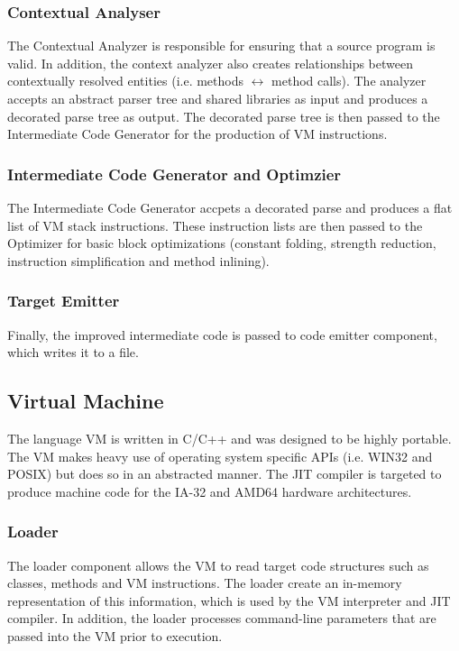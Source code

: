 \documentclass[11pt]{article}
\begin{document}
\subsubsection{Contextual Analyser}
The Contextual Analyzer is responsible for ensuring that a source
program is valid.  In addition, the context analyzer also creates
relationships between contextually resolved entities (i.e. methods
$\longleftrightarrow$ method calls).  The analyzer accepts an abstract
parser tree and shared libraries as input and produces a decorated
parse tree as output.  The decorated parse tree is then passed to the
Intermediate Code Generator for the production of VM instructions.

\subsubsection{Intermediate Code Generator and Optimzier}
The Intermediate Code Generator accpets a decorated parse and produces
a flat list of VM stack instructions.  These instruction lists are
then passed to the Optimizer for basic block optimizations (constant
folding, strength reduction, instruction simplification and method
inlining).

\subsubsection{Target Emitter}
Finally, the improved intermediate code is passed to code emitter
component, which writes it to a file.

\subsection{Virtual Machine}
The language VM is written in C/C++ and was designed to be highly
portable.  The VM makes heavy use of operating system specific APIs
(i.e. WIN32 and POSIX) but does so in an abstracted manner.  The JIT
compiler is targeted to produce machine code for the IA-32 and AMD64
hardware architectures.

\subsubsection{Loader}
The loader component allows the VM to read target code structures such
as classes, methods and VM instructions.  The loader create an
in-memory representation of this information, which is used by the VM
interpreter and JIT compiler.  In addition, the loader processes
command-line parameters that are passed into the VM prior to
execution.
\end{document}
